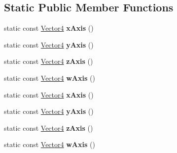 \subsection*{Static Public Member Functions}
\begin{DoxyCompactItemize}
\item 
\hypertarget{classVectormath_1_1Soa_1_1Vector4_afcb5f3e3ca84dad16ad5825b2c2d3477}{static const \hyperlink{classVectormath_1_1Soa_1_1Vector4}{Vector4} {\bfseries x\-Axis} ()}\label{classVectormath_1_1Soa_1_1Vector4_afcb5f3e3ca84dad16ad5825b2c2d3477}

\item 
\hypertarget{classVectormath_1_1Soa_1_1Vector4_ad6c6351367a4264d62612c21ad4ce4f6}{static const \hyperlink{classVectormath_1_1Soa_1_1Vector4}{Vector4} {\bfseries y\-Axis} ()}\label{classVectormath_1_1Soa_1_1Vector4_ad6c6351367a4264d62612c21ad4ce4f6}

\item 
\hypertarget{classVectormath_1_1Soa_1_1Vector4_af4fd932c3e43c3eae28c3e14b43b7d6c}{static const \hyperlink{classVectormath_1_1Soa_1_1Vector4}{Vector4} {\bfseries z\-Axis} ()}\label{classVectormath_1_1Soa_1_1Vector4_af4fd932c3e43c3eae28c3e14b43b7d6c}

\item 
\hypertarget{classVectormath_1_1Soa_1_1Vector4_aab5c50b00703f73dc5f3c320d726c611}{static const \hyperlink{classVectormath_1_1Soa_1_1Vector4}{Vector4} {\bfseries w\-Axis} ()}\label{classVectormath_1_1Soa_1_1Vector4_aab5c50b00703f73dc5f3c320d726c611}

\item 
\hypertarget{classVectormath_1_1Soa_1_1Vector4_ac85ecc91de6b2206b64fd9c3df3702f5}{static const \hyperlink{classVectormath_1_1Soa_1_1Vector4}{Vector4} {\bfseries x\-Axis} ()}\label{classVectormath_1_1Soa_1_1Vector4_ac85ecc91de6b2206b64fd9c3df3702f5}

\item 
\hypertarget{classVectormath_1_1Soa_1_1Vector4_a97e7ec43b008e31d39068c0c6fd54de3}{static const \hyperlink{classVectormath_1_1Soa_1_1Vector4}{Vector4} {\bfseries y\-Axis} ()}\label{classVectormath_1_1Soa_1_1Vector4_a97e7ec43b008e31d39068c0c6fd54de3}

\item 
\hypertarget{classVectormath_1_1Soa_1_1Vector4_a0026691bc6b44a364318d444d05734d9}{static const \hyperlink{classVectormath_1_1Soa_1_1Vector4}{Vector4} {\bfseries z\-Axis} ()}\label{classVectormath_1_1Soa_1_1Vector4_a0026691bc6b44a364318d444d05734d9}

\item 
\hypertarget{classVectormath_1_1Soa_1_1Vector4_a7ee75a6e33c8d5c2f29992bf19091551}{static const \hyperlink{classVectormath_1_1Soa_1_1Vector4}{Vector4} {\bfseries w\-Axis} ()}\label{classVectormath_1_1Soa_1_1Vector4_a7ee75a6e33c8d5c2f29992bf19091551}

\end{DoxyCompactItemize}


